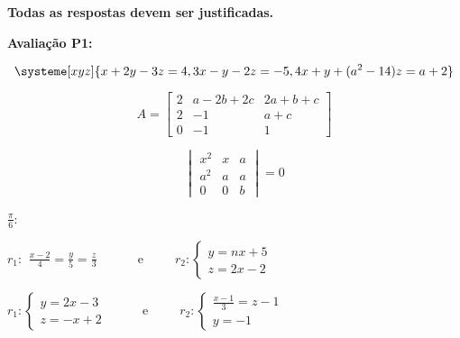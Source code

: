 \documentclass{prova}
\newcommand{\ds}{\displaystyle}
\begin{document}

    \textbf{Todas as respostas devem ser justificadas.}
    \vspace{0.5cm}

    \textbf{Avalia\c{c}\~ao P1:}
    \vspace{-0.5cm}

    \begin{questionario}
            \[\systeme[xyz]{
                x + 2y - 3z = 4,
                3x - y - 2z = -5,
                4x + y + {(a^2-14)}z = a+2
            }\]
        \vspace{-1cm}

            \[A = \begin{bmatrix}
                2 & a-2b+2c & 2a+b+c \\
                2 & -1 & a+c \\
                0 & -1 & 1
            \end{bmatrix}\]
        \vspace{-1cm}

            \[\begin{vmatrix}
                x^2 & x & a \\
                a^2 & a & a \\
                0 & 0 & b
            \end{vmatrix}=0\]
        \vspace{-1cm}

            $\frac{\pi}{6}$:

            $r_1:\begin{array}{l}
                \ds\frac{x-2}{4} = \frac{y}{5} = \frac{z}{3}
            \end{array}$
            \ \ \ \ \ e\ \ \ \ \ 
            $r_2:\left\{\begin{array}{l}
                y = nx + 5 \\
                z = 2x - 2
            \end{array}\right.$

            $r_1:\left\{\begin{array}{l}
                y = 2x - 3 \\
                z = -x + 2
            \end{array}\right.$
            \ \ \ \ \ e\ \ \ \ \ 
            $r_2:\left\{\begin{array}{l}
                \frac{x-1}{3} = z-1 \\
                y = -1
            \end{array}\right.$
    \end{questionario}
    \vspace{0.5cm}
\end{document}
